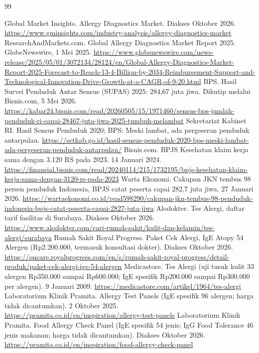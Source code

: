 \documentclass[11pt,a4paper]{article}
\begin{document}
\begin{thebibliography}{99}\small\raggedright
\setlength{\itemsep}{2pt}
 Global Market Insights. Allergy Diagnostics Market. Diakses Oktober 2026. \url{https://www.gminsights.com/industry-analysis/allergy-diagnostics-market}
 ResearchAndMarkets.com. Global Allergy Diagnostics Market Report 2025. GlobeNewswire, 1 Mei 2025. \url{https://www.globenewswire.com/news-release/2025/05/01/3072134/28124/en/Global-Allergy-Diagnostics-Market-Report-2025-Forecast-to-Reach-13-4-Billion-by-2034-Reimbursement-Support-and-Technological-Innovation-Drive-Growth-at-a-CAGR-of-9-20.html}
 BPS. Hasil Survei Penduduk Antar Sensus (SUPAS) 2025: 284,67 juta jiwa. Dikutip melalui Bisnis.com, 5 Mei 2026. \url{https://kabar24.bisnis.com/read/20260505/15/1971460/sensus-bps-jumlah-penduduk-ri-capai-28467-juta-jiwa-2025-tumbuh-melambat}
 Sekretariat Kabinet RI. Hasil Sensus Penduduk 2020; BPS: Meski lambat, ada pergeseran penduduk antarpulau. \url{https://setkab.go.id/hasil-sensus-penduduk-2020-bps-meski-lambat-ada-pergeseran-penduduk-antarpulau/}
 Bisnis.com. BPJS Kesehatan klaim kerja sama dengan 3.120 RS pada 2023. 14 Januari 2024. \url{https://finansial.bisnis.com/read/20240114/215/1732195/bpjs-kesehatan-klaim-kerja-sama-dengan-3120-rs-pada-2023}
 Warta Ekonomi. Cakupan JKN tembus 98 persen penduduk Indonesia, BPJS catat peserta capai 282,7 juta jiwa. 27 Januari 2026. \url{https://wartaekonomi.co.id/read598290/cakupan-jkn-tembus-98-penduduk-indonesia-bpjs-catat-peserta-capai-2827-juta-jiwa}
 Alodokter. Tes Alergi, daftar tarif fasilitas di Surabaya. Diakses Oktober 2026. \url{https://www.alodokter.com/cari-rumah-sakit/kulit-dan-kelamin/tes-alergi/surabaya}
 Rumah Sakit Royal Progress. Paket Cek Alergi, IgE Atopy 54 Alergen (Rp2.200.000, termasuk konsultasi dokter). Diakses Oktober 2026. \url{https://oncare.royalprogress.com/en/s/rumah-sakit-royal-progress/detail-produk/paket-cek-alergi-ige-54-alergen}
 Medicastore. Tes Alergi (uji tusuk kulit 33 alergen Rp350.000 sampai Rp600.000; IgE spesifik Rp200.000 sampai Rp300.000 per alergen). 9 Januari 2009. \url{https://medicastore.com/artikel/1964/tes-alergi}
 Laboratorium Klinik Pramita. Allergy Test Panels (IgE spesifik 96 alergen; harga tidak dicantumkan). 2 Oktober 2025. \url{https://pramita.co.id/en/inspiration/allergy-test-panels}
 Laboratorium Klinik Pramita. Food Allergy Check Panel (IgE spesifik 54 jenis; IgG Food Tolerance 46 jenis makanan; harga tidak dicantumkan). Diakses Oktober 2026. \url{https://pramita.co.id/en/inspiration/food-allergy-check-panel}

\end{thebibliography}
\end{document}
